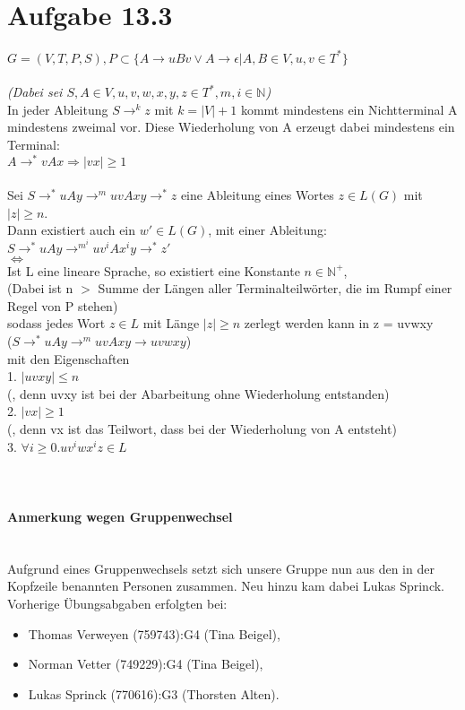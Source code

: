 \documentclass[11pt,a4paper]{article}
\begin{document}
\section*{Aufgabe 13.3}
$G = (V,T,P,S), P \subset \{ A \rightarrow uBv \lor A \rightarrow \epsilon | A,B \in V, u,v \in T^*\}$ \\
\\
\textit{(Dabei sei $S,A \in V, u,v,w,x,y,z \in T^*, m,i \in \mathbb N$)} \\
In jeder Ableitung $S \rightarrow^k z$ mit $k = |V| + 1$ kommt mindestens ein Nichtterminal A mindestens zweimal vor. Diese Wiederholung von A erzeugt dabei mindestens ein Terminal: \\
$A \rightarrow^* vAx \Rightarrow |vx| \geq 1$ \\
\\
Sei $S \rightarrow^* uAy \rightarrow^m uvAxy \rightarrow^* z$ eine Ableitung eines Wortes $z \in L(G)$ mit $|z| \geq n$. \\
Dann existiert auch ein $w' \in L(G)$, mit einer Ableitung: \\
$S \rightarrow^* uAy \rightarrow^{m^i} uv^iAx^iy \rightarrow^* z'$
\\
$\Leftrightarrow$
\\
Ist L eine lineare Sprache, so existiert eine Konstante $n \in \mathbb N^+$, \\
{\centering\tiny{(Dabei ist n $>$ Summe der L\"angen aller Terminalteilw\"orter, die im Rumpf einer Regel von P stehen)}}\\
sodass jedes Wort $z \in L$ mit L\"ange $|z| \geq n$ zerlegt werden kann in z = uvwxy \\
{\centering\tiny{($S \rightarrow^* uAy \rightarrow^m uvAxy \rightarrow uvwxy$)}}\\
mit den Eigenschaften \\
1. $|uvxy| \leq n$ \\
{\centering\tiny{(, denn uvxy ist bei der Abarbeitung ohne Wiederholung entstanden)}}\\
2. $|vx| \geq 1$ \\
{\centering\tiny{(, denn vx ist das Teilwort, dass bei der Wiederholung von A entsteht)}}\\
3. $\forall i \geq 0. uv^iwx^iz \in L$
\ \\
\ \\
\ \\
\paragraph{Anmerkung wegen Gruppenwechsel}
\ \\
Aufgrund eines Gruppenwechsels setzt sich unsere Gruppe nun aus den in der Kopfzeile benannten Personen zusammen.
Neu hinzu kam dabei Lukas Sprinck.
Vorherige Übungsabgaben erfolgten bei:
\begin{itemize}
\item Thomas Verweyen (759743):G4 (Tina Beigel),
\item Norman Vetter (749229):G4 (Tina Beigel),
\item Lukas Sprinck (770616):G3 (Thorsten Alten).
\end{itemize}
\end{document}
